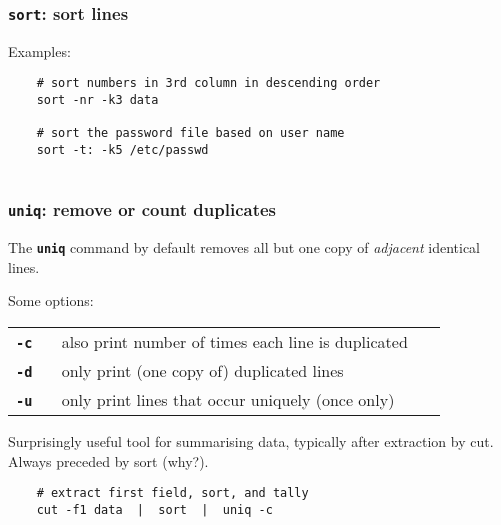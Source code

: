 \begin{frame}[fragile]
\frametitle{\textbf{\tt{sort}}: sort lines}
Examples:
\begin{verbatim}
    # sort numbers in 3rd column in descending order
    sort -nr -k3 data
    
    # sort the password file based on user name
    sort -t: -k5 /etc/passwd
     
\end{verbatim}

\end{frame}

\begin{frame}
\frametitle{\textbf{\tt{uniq}}: remove or count duplicates}
The \textbf{\tt{uniq}} command by default removes all but one copy of {\em{adjacent}} identical lines.

Some options:


\begin{center}
\begin{tabular}{lll}

  \begin{minipage}{2cm}{\bf{\textbf{\tt{-c}}}} ~\end{minipage}
   & \begin{minipage}{18cm}also print number of times each line is duplicated~\end{minipage}
\\[1ex]

  \begin{minipage}{2cm}{\bf{\textbf{\tt{-d}}}} ~\end{minipage}
   & \begin{minipage}{18cm}only print (one copy of) duplicated lines~\end{minipage}
\\[1ex]

  \begin{minipage}{2cm}{\bf{\textbf{\tt{-u}}}} ~\end{minipage}
   & \begin{minipage}{18cm}only print lines that occur uniquely (once only)~\end{minipage}
\\[1ex]
\end{tabular}
\end{center}


Surprisingly useful tool for summarising data,
typically after extraction by cut.
Always preceded by sort (why?).
\begin{verbatim}
    # extract first field, sort, and tally
    cut -f1 data  |  sort  |  uniq -c
\end{verbatim}

\end{frame}

